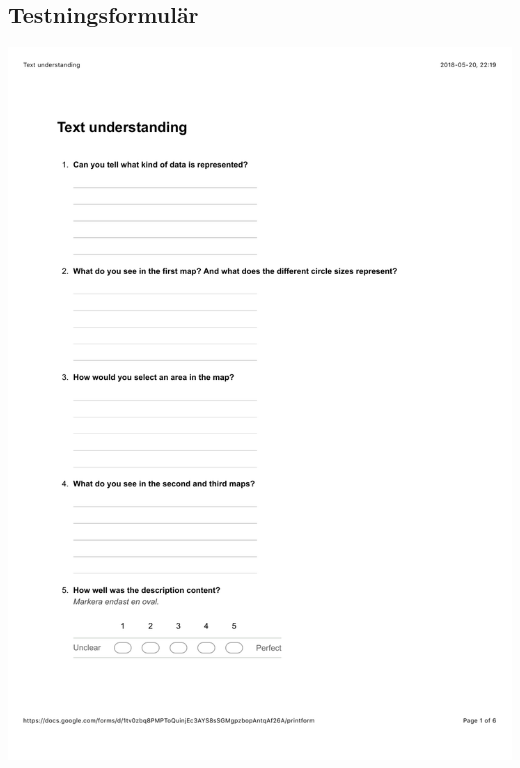 \documentclass[12pt]{kththesis}
\begin{document}
\begin{appendices}
\section{Testningsformulär}
\includegraphics[width=1\textwidth]{TextUnderstanding1.pdf}
\newpage

\end{appendices}
\end{document}
